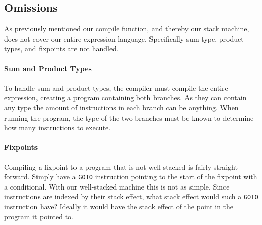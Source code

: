 \subsection{Omissions}
\label{sec:omissions}
As previously mentioned our compile function, and thereby our stack machine, does not cover our entire expression language. Specifically sum type, product types, and fixpoints are not handled. 

\paragraph{Sum and Product Types}
To handle sum and product types, the compiler must compile the entire expression, creating a program containing both branches. As they can contain any type the amount of instructions in each branch can be anything. When running the program, the type of the two branches must be known to determine how many instructions to execute. 

\paragraph{Fixpoints}
Compiling a fixpoint to a program that is not well-stacked is fairly straight forward. Simply have a \texttt{GOTO} instruction pointing to the start of the fixpoint with a conditional. With our well-stacked machine this is not as simple. Since instructions are indexed by their stack effect, what stack effect would such a \texttt{GOTO} instruction have? Ideally it would have the stack effect of the point in the program it pointed to.


%